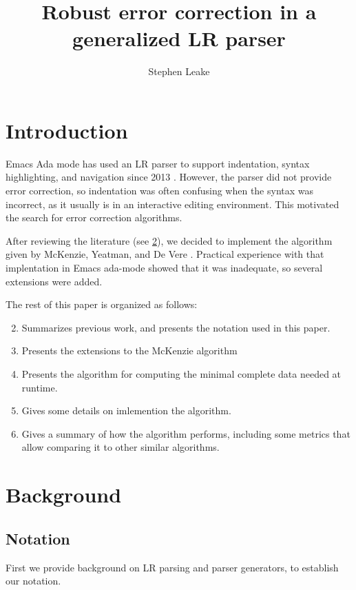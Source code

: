 \documentclass[authordraft]{acmart}
\title{Robust error correction in a generalized LR parser}
\author{Stephen Leake}
\affiliation{retired}
\begin{document}
\maketitle
\section{Introduction}
Emacs Ada mode has used an LR parser to support indentation, syntax
highlighting, and navigation since 2013 \citep{Emacs_Ada_mode_news}.
However, the parser did not provide error correction, so indentation
was often confusing when the syntax was incorrect, as it usually is in
an interactive editing environment. This motivated the search for
error correction algorithms.

After reviewing the literature (see \ref{sect:background}), we decided
to implement the algorithm given by McKenzie, Yeatman, and De Vere
\citep{McKenzie_1995}. Practical experience with that implentation in
Emacs ada-mode showed that it was inadequate, so several extensions
were added.

The rest of this paper is organized as follows:
\begin{enumerate}
  \setcounter{enumi}{1}
\item Summarizes previous work, and presents the
  notation used in this paper.
\item Presents the extensions to the McKenzie algorithm
\item Presents the algorithm for
  computing the minimal complete data needed at runtime.
\item Gives some details on imlemention the algorithm.
\item Gives a summary of how the algorithm performs,
  including some metrics that allow comparing it to other similar
  algorithms.

\end{enumerate}

\pagebreak
\section{Background}
\label{sect:background}
\subsection{Notation}
First we provide background on LR parsing and parser generators, to
establish our notation.
\end{document}
